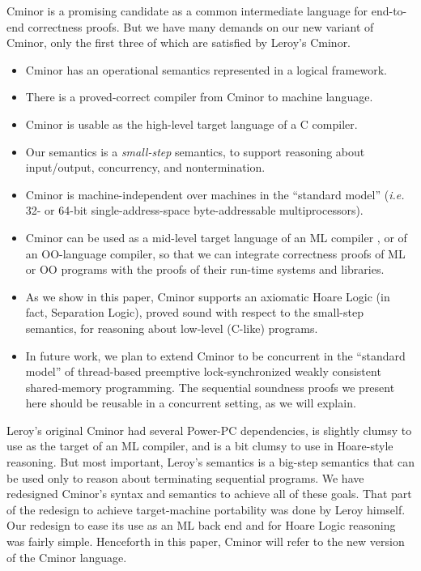\documentclass{llncs}
\newcommand{\cminor}{Cminor}
\begin{document}
\cminor{} is a promising candidate
as a common intermediate language for end-to-end correctness proofs.
But we have many demands on our new variant of \cminor, 
only the first three of which are 
satisfied by Leroy's \cminor.
\begin{itemize}
\item[] \cminor{} has an operational semantics
represented in a logical framework.
\item[] There is a proved-correct compiler from \cminor{} to machine language.
\item[] \cminor{} is usable as the high-level target language of
a C compiler.
\item[] Our semantics is a \emph{small-step} semantics, 
to support reasoning about input/output, concurrency,
and nontermination.
\item[] \cminor{} is machine-independent 
over machines in the ``standard model''
(\textit{i.e.} 32- or 64-bit single-address-space byte-addressable multiprocessors).
\item[] \cminor{} can be used as a mid-level target language of an ML compiler \cite{dargaye:jfla07},
or of an OO-language compiler, so that we can
integrate correctness proofs of ML or OO programs with the
proofs of their run-time systems and libraries.
\item[] As we show in this paper, \cminor{} supports an axiomatic Hoare Logic 
(in fact, Separation Logic), proved sound
with respect to the small-step semantics, for reasoning about low-level 
(C-like) programs.
\item[] 
In future work, we plan to extend \cminor{} to
\label{L-Concur}
 be concurrent in  the ``standard model'' of thread-based 
preemptive lock-synchronized weakly consistent shared-memory programming.
The sequential soundness proofs we present here should be reusable
in a concurrent setting, as we will explain.
\end{itemize}

Leroy's original \cminor{} had several Power-PC dependencies,
is slightly clumsy to use as the target of an ML compiler,
and is a bit clumsy to use in Hoare-style reasoning.
But most important, Leroy's semantics is a big-step semantics
that can be used only to reason about terminating sequential 
programs.
We have redesigned \cminor's syntax and semantics 
to achieve all of these goals.
That part of the redesign to achieve target-machine portability was
done by Leroy himself.  
Our redesign to ease its use as an ML back end
and for Hoare Logic reasoning was fairly simple.
Henceforth in this paper, \cminor{} will refer to the new version of the \cminor{} language.
\end{document}
